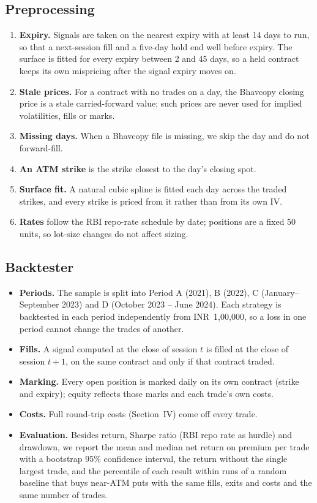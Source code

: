 \documentclass[10pt,journal,compsoc]{IEEEtran}
\begin{document}
\subsection{Preprocessing}
\begin{enumerate}
    \item \textbf{Expiry.} Signals are taken on the nearest expiry with at least 14 days to run, so that a next-session fill and a five-day hold end well before expiry. The surface is fitted for every expiry between 2 and 45 days, so a held contract keeps its own mispricing after the signal expiry moves on.
    \item \textbf{Stale prices.} For a contract with no trades on a day, the Bhavcopy closing price is a stale carried-forward value; such prices are never used for implied volatilities, fills or marks.
    \item \textbf{Missing days.} When a Bhavcopy file is missing, we skip the day and do not forward-fill.
    \item \textbf{An ATM strike} is the strike closest to the day's closing spot.
    \item \textbf{Surface fit.} A natural cubic spline is fitted each day across the traded strikes, and every strike is priced from it rather than from its own IV.
    \item \textbf{Rates} follow the RBI repo-rate schedule by date; positions are a fixed 50 units, so lot-size changes do not affect sizing.
\end{enumerate}

\subsection{Backtester}
\begin{itemize}
    \item \textbf{Periods.} The sample is split into Period A (2021), B (2022), C (January--September 2023) and D (October 2023 -- June 2024). Each strategy is backtested in each period independently from INR~1,00,000, so a loss in one period cannot change the trades of another.
    \item \textbf{Fills.} A signal computed at the close of session $t$ is filled at the close of session $t+1$, on the same contract and only if that contract traded.
    \item \textbf{Marking.} Every open position is marked daily on its own contract (strike and expiry); equity reflects those marks and each trade's own costs.
    \item \textbf{Costs.} Full round-trip costs (Section~IV) come off every trade.
    \item \textbf{Evaluation.} Besides return, Sharpe ratio (RBI repo rate as hurdle) and drawdown, we report the mean and median net return on premium per trade with a bootstrap 95\% confidence interval, the return without the single largest trade, and the percentile of each result within \RandomDraws{} runs of a random baseline that buys near-ATM puts with the same fills, exits and costs and the same number of trades.
\end{itemize}
\end{document}

